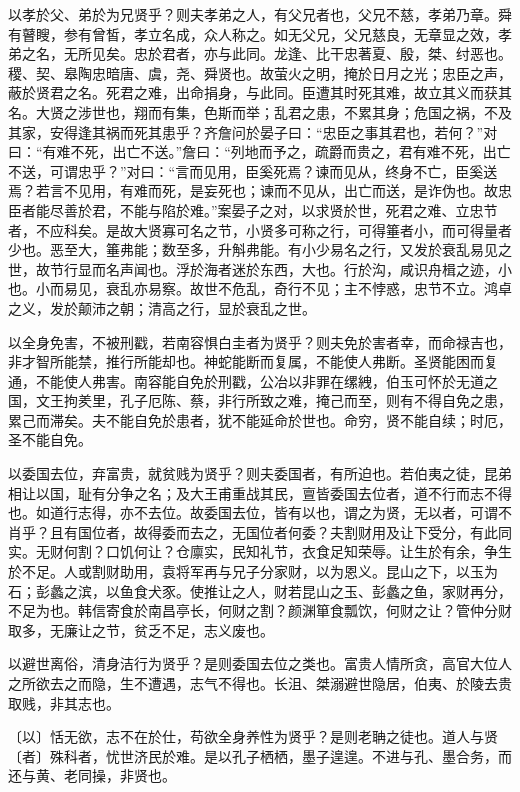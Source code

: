\documentclass[]{article}
\begin{document}
以孝於父、弟於为兄贤乎？则夫孝弟之人，有父兄者也，父兄不慈，孝弟乃章。舜有瞽瞍，参有曾皙，孝立名成，众人称之。如无父兄，父兄慈良，无章显之效，孝弟之名，无所见矣。忠於君者，亦与此同。龙逢、比干忠著夏、殷，桀、纣恶也。稷、契、皋陶忠暗唐、虞，尧、舜贤也。故萤火之明，掩於日月之光；忠臣之声，蔽於贤君之名。死君之难，出命捐身，与此同。臣遭其时死其难，故立其义而获其名。大贤之涉世也，翔而有集，色斯而举；乱君之患，不累其身；危国之祸，不及其家，安得逢其祸而死其患乎？齐詹问於晏子曰：``忠臣之事其君也，若何？''对曰：``有难不死，出亡不送。''詹曰：``列地而予之，疏爵而贵之，君有难不死，出亡不送，可谓忠乎？''对曰：``言而见用，臣奚死焉？谏而见从，终身不亡，臣奚送焉？若言不见用，有难而死，是妄死也；谏而不见从，出亡而送，是诈伪也。故忠臣者能尽善於君，不能与陷於难。''案晏子之对，以求贤於世，死君之难、立忠节者，不应科矣。是故大贤寡可名之节，小贤多可称之行，可得箠者小，而可得量者少也。恶至大，箠弗能；数至多，升斛弗能。有小少易名之行，又发於衰乱易见之世，故节行显而名声闻也。浮於海者迷於东西，大也。行於沟，咸识舟楫之迹，小也。小而易见，衰乱亦易察。故世不危乱，奇行不见；主不悖惑，忠节不立。鸿卓之义，发於颠沛之朝；清高之行，显於衰乱之世。

以全身免害，不被刑戳，若南容惧白圭者为贤乎？则夫免於害者幸，而命禄吉也，非才智所能禁，推行所能却也。神蛇能断而复属，不能使人弗断。圣贤能困而复通，不能使人弗害。南容能自免於刑戳，公冶以非罪在缧絏，伯玉可怀於无道之国，文王拘羑里，孔子厄陈、蔡，非行所致之难，掩己而至，则有不得自免之患，累己而滞矣。夫不能自免於患者，犹不能延命於世也。命穷，贤不能自续；时厄，圣不能自免。

以委国去位，弃富贵，就贫贱为贤乎？则夫委国者，有所迫也。若伯夷之徒，昆弟相让以国，耻有分争之名；及大王甫重战其民，亶皆委国去位者，道不行而志不得也。如道行志得，亦不去位。故委国去位，皆有以也，谓之为贤，无以者，可谓不肖乎？且有国位者，故得委而去之，无国位者何委？夫割财用及让下受分，有此同实。无财何割？口饥何让？仓廪实，民知礼节，衣食足知荣辱。让生於有余，争生於不足。人或割财助用，袁将军再与兄子分家财，以为恩义。昆山之下，以玉为石；彭蠡之滨，以鱼食犬豕。使推让之人，财若昆山之玉、彭蠡之鱼，家财再分，不足为也。韩信寄食於南昌亭长，何财之割？颜渊箪食瓢饮，何财之让？管仲分财取多，无廉让之节，贫乏不足，志义废也。

以避世离俗，清身洁行为贤乎？是则委国去位之类也。富贵人情所贪，高官大位人之所欲去之而隐，生不遭遇，志气不得也。长沮、桀溺避世隐居，伯夷、於陵去贵取贱，非其志也。

〔以〕恬无欲，志不在於仕，苟欲全身养性为贤乎？是则老聃之徒也。道人与贤〔者〕殊科者，忧世济民於难。是以孔子栖栖，墨子遑遑。不进与孔、墨合务，而还与黄、老同操，非贤也。
\end{document}
